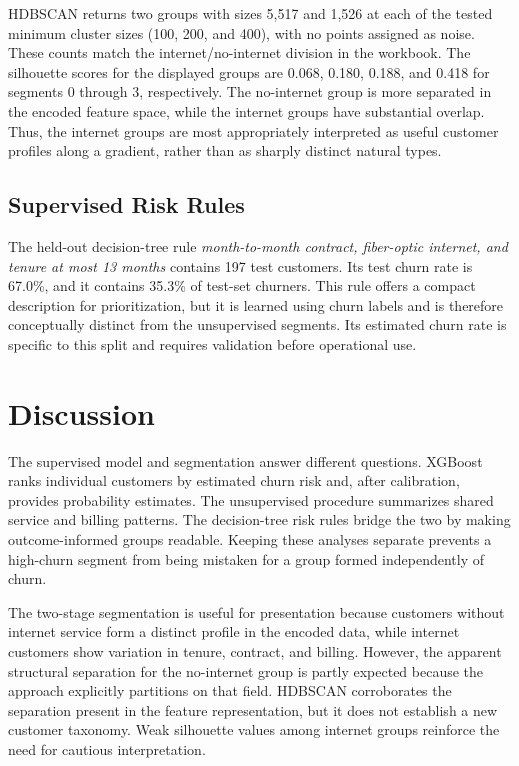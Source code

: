\documentclass[conference]{IEEEtran}
\begin{document}
HDBSCAN returns two groups with sizes 5,517 and 1,526 at each of the tested minimum cluster sizes (100, 200, and 400), with no points assigned as noise. These counts match the internet/no-internet division in the workbook. The silhouette scores for the displayed groups are 0.068, 0.180, 0.188, and 0.418 for segments 0 through 3, respectively. The no-internet group is more separated in the encoded feature space, while the internet groups have substantial overlap. Thus, the internet groups are most appropriately interpreted as useful customer profiles along a gradient, rather than as sharply distinct natural types.

\subsection{Supervised Risk Rules}
The held-out decision-tree rule \emph{month-to-month contract, fiber-optic internet, and tenure at most 13 months} contains 197 test customers. Its test churn rate is 67.0\%, and it contains 35.3\% of test-set churners. This rule offers a compact description for prioritization, but it is learned using churn labels and is therefore conceptually distinct from the unsupervised segments. Its estimated churn rate is specific to this split and requires validation before operational use.

\section{Discussion}
The supervised model and segmentation answer different questions. XGBoost ranks individual customers by estimated churn risk and, after calibration, provides probability estimates. The unsupervised procedure summarizes shared service and billing patterns. The decision-tree risk rules bridge the two by making outcome-informed groups readable. Keeping these analyses separate prevents a high-churn segment from being mistaken for a group formed independently of churn.

The two-stage segmentation is useful for presentation because customers without internet service form a distinct profile in the encoded data, while internet customers show variation in tenure, contract, and billing. However, the apparent structural separation for the no-internet group is partly expected because the approach explicitly partitions on that field. HDBSCAN corroborates the separation present in the feature representation, but it does not establish a new customer taxonomy. Weak silhouette values among internet groups reinforce the need for cautious interpretation.
\end{document}
